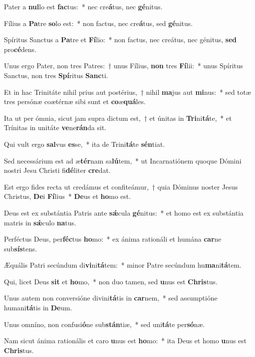 \item Pater a \textbf{nul}lo est \textbf{fac}tus:~* nec cre\textbf{á}tus, nec \textbf{gé}nitus.
\item Fílius a \textbf{Pa}tre \textbf{so}lo est:~* non factus, nec cre\textbf{á}tus, sed \textbf{gé}nitus.
\item Spíritus Sanctus a \textbf{Pa}tre et \textbf{Fí}lio:~* non factus, nec creátus, nec génitus, \textbf{sed} pro\textbf{cé}dens.
\item Unus ergo Pater, non tres Patres:~† unus Fílius, \textbf{non} tres \textbf{Fí}lii:~* unus Spíritus Sanctus, non tres \textbf{Spí}ritus \textbf{Sanc}ti.
\item Et in hac Trinitáte nihil prius aut postérius,~† nihil \textbf{ma}jus aut \textbf{mi}nus:~* sed totæ tres persónæ coætérnæ sibi sunt et \textbf{co}æ\textbf{quá}les.
\item Ita ut per ómnia, sicut jam supra dictum est,~† et únitas in \textbf{Tri}ni\textbf{tá}te,~* et Trínitas in unitáte \textbf{ve}ne\textbf{rán}da sit.
\item Qui vult ergo \textbf{sal}vus \textbf{es}se,~* ita de Trini\textbf{tá}te \textbf{sén}tiat.
\item Sed necessárium est ad æ\textbf{tér}nam sa\textbf{lú}tem,~* ut Incarnatiónem quoque Dómini nostri Jesu Christi fi\textbf{dé}liter \textbf{cre}dat.
\item Est ergo fides recta ut credámus et confiteámur,~† quia Dóminus noster Jesus Christus, \textbf{De}i \textbf{Fí}lius~* \textbf{De}us et \textbf{ho}mo est.
\item Deus est ex substántia Patris ante \textbf{sǽ}cula \textbf{gé}nitus:~* et homo est ex substántia matris in \textbf{sǽ}culo \textbf{na}tus.
\item Perféctus Deus, per\textbf{féc}tus \textbf{ho}mo:~* ex ánima rationáli et humána \textbf{car}ne sub\textbf{sís}tens.
\item Æquális Patri secúndum di\textbf{vi}ni\textbf{tá}tem:~* minor Patre secúndum hu\textbf{ma}ni\textbf{tá}tem.
\item Qui, licet Deus \textbf{sit} et \textbf{ho}mo,~* non duo tamen, sed \textbf{u}nus est \textbf{Chris}tus.
\item Unus autem non conversióne divini\textbf{tá}tis in \textbf{car}nem,~* sed assumptióne humani\textbf{tá}tis in \textbf{De}um.
\item Unus omníno, non confusi\textbf{ó}ne sub\textbf{stán}tiæ,~* sed uni\textbf{tá}te per\textbf{só}næ.
\item Nam sicut ánima rationális et caro \textbf{u}nus est \textbf{ho}mo:~* ita Deus et homo \textbf{u}nus est \textbf{Chris}tus.
